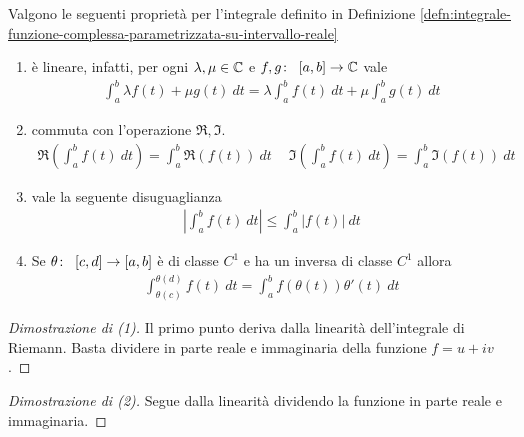 \begin{proposition}
	\label{prop:proprieta-funzione-complessa-parametrizzata-su-intervallo-reale}
	Valgono le seguenti proprietà per l'integrale definito in Definizione \ref{defn:integrale-funzione-complessa-parametrizzata-su-intervallo-reale}
	\begin{enumerate}
		\item è lineare, infatti, per ogni $\lambda, \mu \in \mathbb{C}$ e $f,g \colon\ \left[a,b\right] \rightarrow \mathbb{C}$ vale
		\begin{equation*}
		\begin{aligned}
		\int_{a}^{b} \lambda f(t)  + \mu g(t)\ dt = \lambda \int_{a}^{b} f(t)\ dt + \mu \int_{a}^{b} g(t)\ dt   
		\end{aligned}
		\end{equation*}
		\item commuta con l'operazione $\Re, \Im$.
		\begin{equation*}
		\begin{aligned}	
		\Re\left(\int_{a}^{b} f(t)\ dt\right) = \int_{a}^{b} \Re(f(t))\ dt \quad\ \Im\left(\int_{a}^{b} f(t)\ dt\right) = \int_{a}^{b} \Im(f(t))\ dt
		\end{aligned}
		\end{equation*} 
		\item vale la seguente disuguaglianza
		\begin{equation*}
		\begin{aligned}
		\left|\int_{a}^{b} f(t)\ dt\right| \le \int_{a}^{b} |f(t)|\ dt
		\end{aligned}
		\end{equation*}
		\item Se $\theta \colon\ \left[c,d\right] \rightarrow \left[a,b\right]$ è di classe $C^1$ e ha un inversa di classe $C^1$ allora
		\begin{equation*}
		\begin{aligned}
		\int_{\theta(c)}^{\theta(d)} f(t)\ dt = \int_{a}^{b} f(\theta(t))\theta'(t)\ dt
		\end{aligned}
		\end{equation*}
	\end{enumerate} 
\end{proposition}
\begin{proof}[Dimostrazione di (1)]
	Il primo punto deriva dalla linearità dell'integrale di Riemann. 
	Basta dividere in parte reale e immaginaria della funzione $f = u+ iv$.
\end{proof}

\begin{proof}[Dimostrazione di (2)]
	Segue dalla linearità dividendo la funzione in parte reale e immaginaria.	
\end{proof}

